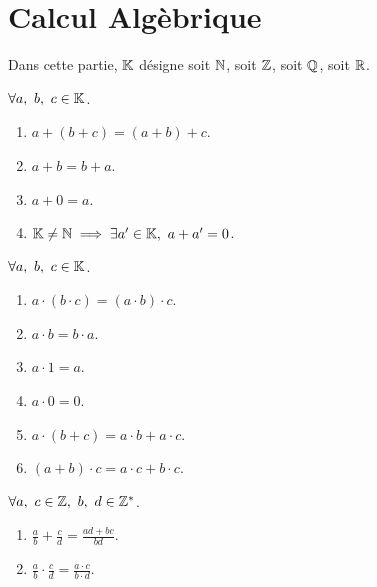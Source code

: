 \chapter{Calcul Algèbrique}
\par \noindent Dans cette partie, $\mathbb{K}$ désigne soit $\mathbb{N}$, soit $\mathbb{Z}$, soit $\mathbb{Q}$, soit $\mathbb{R}$.

\begin{axiom}
    $\forall a,\ b,\ c \in \mathbb{K}$.
    \begin{enumerate}
    	\item $a + (b + c) = (a + b) + c$.
    	\item $a + b = b + a$.
    	\item $a + 0 = a$.
    	\item $\mathbb{K} \neq \mathbb{N} \implies \exists a' \in \mathbb{K},\ a + a' = 0$.
    \end{enumerate}
\end{axiom}

\begin{axiom}
    $\forall a,\ b,\ c \in \mathbb{K}$. 
    \begin{enumerate}
    	\item $a \cdot (b \cdot c) = (a \cdot b) \cdot c$.
    	\item $a \cdot b = b \cdot a$.
    	\item $a \cdot 1 = a$.
    	\item $a \cdot 0 = 0$.
    	\item $a \cdot (b + c) = a \cdot b + a \cdot c$.
    	\item $(a + b) \cdot c = a \cdot c + b \cdot c$.
    \end{enumerate}
\end{axiom}

\begin{proposition}
    $\forall a,\ c \in \mathbb{Z},\ b,\ d \in \mathbb{Z}^*$.
    \begin{multicols}{2}
    	\begin{enumerate}
    		\item $\frac{a}{b} + \frac{c}{d} = \frac{ad + bc}{bd}$.
    		\item $\frac{a}{b} \cdot \frac{c}{d} = \frac{a \cdot c}{b \cdot d}$.
    	\end{enumerate}
    \end{multicols}
\end{proposition}


